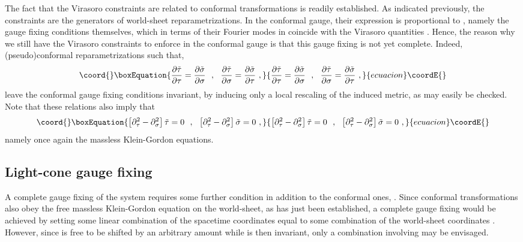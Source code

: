 \documentclass[a4paper,11pt]{article}
\begin{document}
The fact that the Virasoro constraints are related to conformal 
transformations is readily established. As indicated previously,
the constraints \coordHE{} are the generators
of world-sheet reparametrizations. In the conformal gauge, their expression
is proportional to \coordHE{}, namely the gauge fixing conditions
themselves, which in terms of their Fourier modes in \myHighlight{$\sigma$}\coordHE{} coincide
with the Virasoro quantities \coordHE{}. Hence, the reason
why we still have the Virasoro constraints to enforce in the conformal
gauge is that this gauge fixing is not yet complete. Indeed,
(pseudo)conformal reparametrizations \myHighlight{$\tilde{\xi}=\tilde{\xi}(\xi)$}\coordHE{} such that,
\begin{equation}\coord{}\boxEquation{
\frac{\partial\tilde{\tau}}{\partial\tau}=
\frac{\partial\tilde{\sigma}}{\partial\sigma}\ \ ,\ \ 
\frac{\partial\tilde{\tau}}{\partial\sigma}=
\frac{\partial\tilde{\sigma}}{\partial\tau}\ ,
}{
\frac{\partial\tilde{\tau}}{\partial\tau}=
\frac{\partial\tilde{\sigma}}{\partial\sigma}\ \ ,\ \ 
\frac{\partial\tilde{\tau}}{\partial\sigma}=
\frac{\partial\tilde{\sigma}}{\partial\tau}\ ,
}{ecuacion}\coordE{}\end{equation}
leave the conformal gauge fixing conditions invariant, by inducing only
a local rescaling of the induced metric, as may easily be checked. Note that
these relations also imply that
\begin{equation}\coord{}\boxEquation{
\left[\partial^2_\tau-\partial^2_\sigma\right]\tilde{\tau}=0\ \ ,\ \ 
\left[\partial^2_\tau-\partial^2_\sigma\right]\tilde{\sigma}=0\ ,
}{
\left[\partial^2_\tau-\partial^2_\sigma\right]\tilde{\tau}=0\ \ ,\ \ 
\left[\partial^2_\tau-\partial^2_\sigma\right]\tilde{\sigma}=0\ ,
}{ecuacion}\coordE{}\end{equation}
namely once again the massless Klein-Gordon equations.

\subsection{Light-cone gauge fixing}
\label{Subsect7.3}

A complete gauge fixing of the system requires some further condition
in addition to the conformal ones, \coordHE{}. Since conformal
transformations also obey the free massless Klein-Gordon equation on the
world-sheet, as has just been established, a complete gauge fixing would
be achieved by setting some linear combination of the spacetime coordinates
\myHighlight{$x^\mu$}\coordHE{} equal to some combination of the world-sheet coordinates 
\myHighlight{$(\tau,\sigma)$}\coordHE{}. However, since \myHighlight{$\sigma$}\coordHE{} is free to be shifted by an arbitrary
amount while \myHighlight{$x^\mu$}\coordHE{} is then invariant, only a combination involving \myHighlight{$\tau$}\coordHE{}
may be envisaged.
\end{document}
